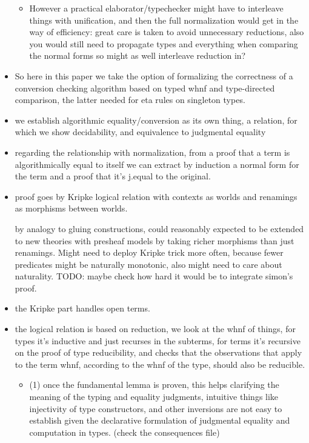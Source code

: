 \documentclass{book}
\begin{document}
\begin{itemize}
\begin{itemize}
   \item However a practical elaborator/typechecker might have to
   interleave things with unification, and then the full normalization
   would get in the way of efficiency: great care is taken to avoid
   unnecessary reductions, also you would still need to propagate
   types and everything when comparing the normal forms so might as
   well interleave reduction in?
   \end{itemize}

 \item So here in this paper we take the option of formalizing the
 correctness of a conversion checking algorithm based on typed whnf and
 type-directed comparison, the latter needed for eta rules on singleton types.

 \item we establish algorithmic equality/conversion as its own thing, a
 relation, for which we show decidability, and equivalence to
 judgmental equality

 \item regarding the relationship with normalization, from a proof that a
 term is algorithmically equal to itself we can extract by induction a
 normal form for the term and a proof that it's j.equal to the
 original.

 \item proof goes by Kripke logical relation with contexts as worlds and renamings as morphisms between worlds.

   by analogy to gluing constructions, could reasonably expected to
   be extended to new theories with presheaf models by taking richer
   morphisms than just renamings.
   Might need to deploy Kripke trick more often, because fewer
   predicates might be naturally monotonic, also might need to care
   about naturality.
   TODO: maybe check how hard it would be to integrate simon's proof.

 \item the Kripke part handles open terms.

 \item the logical relation is based on reduction, we look at the whnf of
 things, for types it's inductive and just recurses in the subterms,
 for terms it's recursive on the proof of type reducibility, and checks that
 the observations that apply to the term whnf, according to the whnf of
 the type, should also be reducible.
   \begin{itemize}
   \item (1) once the fundamental lemma is proven, this helps clarifying
     the meaning of the typing and equality
     judgments, intuitive things like injectivity of type constructors,
     and other inversions are not easy to establish given
     the declarative formulation of judgmental equality
     and computation in types. (check the consequences file)


\end{itemize}
\end{itemize}
\end{document}
